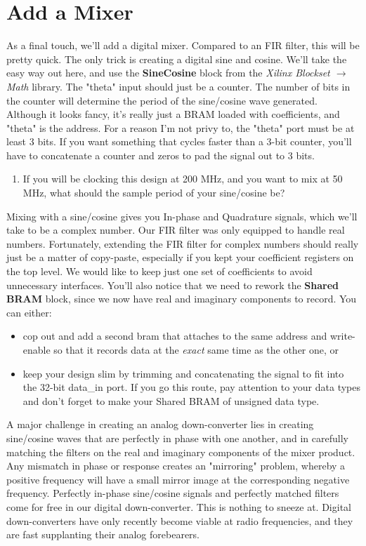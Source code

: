 \documentclass[11pt]{article}
\begin{document}
\section{Add a Mixer}

As a final touch, we'll add a digital mixer.  Compared to an FIR filter, this will be pretty quick.  The only trick
is creating a digital sine and cosine.  We'll take the easy way out here, and use the {\bf SineCosine} block from the
{\it Xilinx Blockset $\rightarrow$ Math} library.  The "theta" input should just be a counter.  The number of bits
in the counter will determine the period of the sine/cosine wave generated.  Although it looks fancy, it's really just
a BRAM loaded with coefficients, and "theta" is the address.  For a reason I'm not privy to, the "theta" port must be
at least 3 bits.  If you want something that cycles faster than a 3-bit counter, you'll have to concatenate a counter
and zeros to pad the signal out to 3 bits.

\begin{enumerate}
\item If you will be clocking this design at 200 MHz, and you want to mix 
at 50 MHz, what should the sample period of your sine/cosine be?
\end{enumerate}

Mixing with a sine/cosine gives you In-phase and Quadrature signals, which we'll take to be a complex number.
Our FIR filter was only equipped to handle real numbers.  Fortunately, extending the FIR filter for complex numbers
should really just be a matter of copy-paste, especially if you kept your coefficient registers on the top level.  We
would like to keep just one set of coefficients to avoid unnecessary interfaces.  You'll also notice that we
need to rework the {\bf Shared BRAM} block, since we now have real and imaginary components to record.  You can
either:
\begin{itemize}
\item cop out and add a second bram that attaches to the same address and write-enable so that it records data at the
{\it exact} same time as the other one, or
\item keep your design slim by trimming and concatenating the signal to fit into the 32-bit data\_in port.  If you go
this route, pay attention to your data types and don't forget to make your Shared BRAM of unsigned data type.
\end{itemize}

A major challenge in creating an analog down-converter lies in creating sine/cosine waves that are perfectly in
phase with one another, and in carefully matching the filters on the real and imaginary components of the mixer product.
Any mismatch in phase or response creates an "mirroring" problem, whereby a positive frequency will have a small
mirror image at the corresponding negative frequency.  Perfectly in-phase sine/cosine signals and perfectly matched
filters come for free in our digital down-converter.  This is nothing to sneeze at.  Digital down-converters have only
recently become viable at radio frequencies, and they are fast supplanting their analog forebearers.
\end{document}
